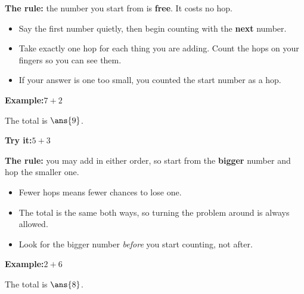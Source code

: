 \documentclass[12pt]{article}
\begin{document}


\begin{formulabox}
\textbf{The rule:} the number you start from is \textbf{free}. It costs no hop.
\begin{itemize}[leftmargin=0.8cm, itemsep=1pt, topsep=2pt]
  \item Say the first number quietly, then begin counting with the
        \textbf{next} number.
  \item Take exactly one hop for each thing you are adding. Count the hops on
        your fingers so you can see them.
  \item If your answer is one too small, you counted the start number as a hop.
\end{itemize}
\end{formulabox}

\begin{examplebox}
\textbf{Example:}\quad $7 + 2$

The total is $\ans{9}$.
\end{examplebox}

\begin{tryitbox}
\textbf{Try it:}\quad $5 + 3$\\[2pt]
\end{tryitbox}


\begin{formulabox}
\textbf{The rule:} you may add in either order, so start from the
\textbf{bigger} number and hop the smaller one.
\begin{itemize}[leftmargin=0.8cm, itemsep=1pt, topsep=2pt]
  \item Fewer hops means fewer chances to lose one.
  \item The total is the same both ways, so turning the problem around is
        always allowed.
  \item Look for the bigger number \emph{before} you start counting, not after.
\end{itemize}
\end{formulabox}

\begin{examplebox}
\textbf{Example:}\quad $2 + 6$

The total is $\ans{8}$.
\end{examplebox}
\end{document}
